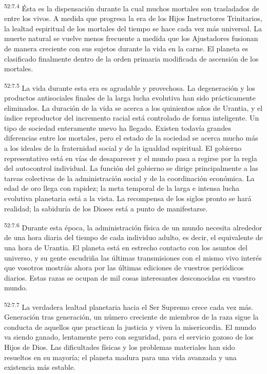\par
\textsuperscript{52:7.4} Ésta es la dispensación durante la cual muchos mortales son trasladados de entre los vivos. A medida que progresa la era de los Hijos Instructores Trinitarios, la lealtad espiritual de los mortales del tiempo se hace cada vez más universal. La muerte natural se vuelve menos frecuente a medida que los Ajustadores fusionan de manera creciente con sus sujetos durante la vida en la carne. El planeta es clasificado finalmente dentro de la orden primaria modificada de ascensión de los mortales.

\par
\textsuperscript{52:7.5} La vida durante esta era es agradable y provechosa. La degeneración y los productos antisociales finales de la larga lucha evolutiva han sido prácticamente eliminados. La duración de la vida se acerca a los quinientos años de Urantia, y el índice reproductor del incremento racial está controlado de forma inteligente. Un tipo de sociedad enteramente nuevo ha llegado. Existen todavía grandes diferencias entre los mortales, pero el estado de la sociedad se acerca mucho más a los ideales de la fraternidad social y de la igualdad espiritual. El gobierno representativo está en vías de desaparecer y el mundo pasa a regirse por la regla del autocontrol individual. La función del gobierno se dirige principalmente a las tareas colectivas de la administración social y de la coordinación económica. La edad de oro llega con rapidez; la meta temporal de la larga e intensa lucha evolutiva planetaria está a la vista. La recompensa de los siglos pronto se hará realidad; la sabiduría de los Dioses está a punto de manifestarse.

\par
\textsuperscript{52:7.6} Durante esta época, la administración física de un mundo necesita alrededor de una hora diaria del tiempo de cada individuo adulto, es decir, el equivalente de una hora de Urantia. El planeta está en estrecho contacto con los asuntos del universo, y su gente escudriña las últimas transmisiones con el mismo vivo interés que vosotros mostráis ahora por las últimas ediciones de vuestros periódicos diarios. Estas razas se ocupan de mil cosas interesantes desconocidas en vuestro mundo.

\par
\textsuperscript{52:7.7} La verdadera lealtad planetaria hacia el Ser Supremo crece cada vez más. Generación tras generación, un número creciente de miembros de la raza sigue la conducta de aquellos que practican la justicia y viven la misericordia. El mundo va siendo ganado, lentamente pero con seguridad, para el servicio gozoso de los Hijos de Dios. Las dificultades físicas y los problemas materiales han sido resueltos en su mayoría; el planeta madura para una vida avanzada y una existencia más estable.

